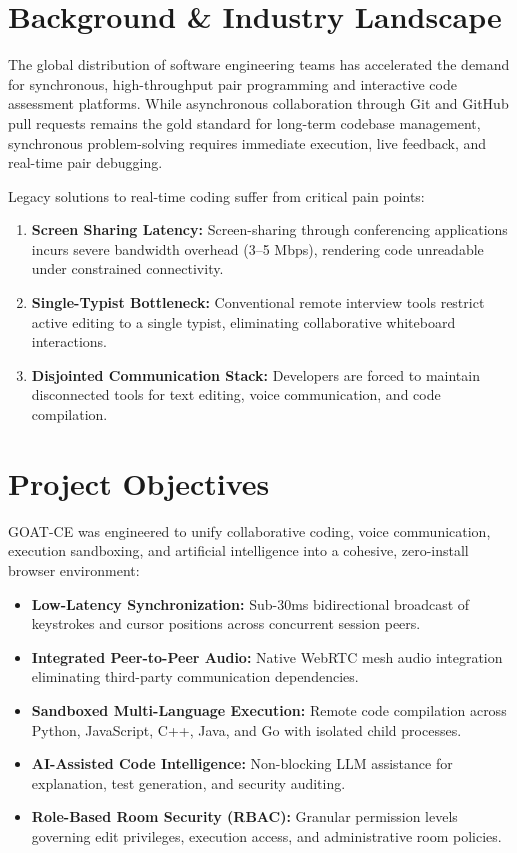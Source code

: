 \documentclass[12pt,a4paper]{report}
\begin{document}
\section{Background \& Industry Landscape}
The global distribution of software engineering teams has accelerated the demand for synchronous, high-throughput pair programming and interactive code assessment platforms. While asynchronous collaboration through Git and GitHub pull requests remains the gold standard for long-term codebase management, synchronous problem-solving requires immediate execution, live feedback, and real-time pair debugging.

Legacy solutions to real-time coding suffer from critical pain points:
\begin{enumerate}
    \item \textbf{Screen Sharing Latency:} Screen-sharing through conferencing applications incurs severe bandwidth overhead (3--5 Mbps), rendering code unreadable under constrained connectivity.
    \item \textbf{Single-Typist Bottleneck:} Conventional remote interview tools restrict active editing to a single typist, eliminating collaborative whiteboard interactions.
    \item \textbf{Disjointed Communication Stack:} Developers are forced to maintain disconnected tools for text editing, voice communication, and code compilation.
\end{enumerate}

\section{Project Objectives}
GOAT-CE was engineered to unify collaborative coding, voice communication, execution sandboxing, and artificial intelligence into a cohesive, zero-install browser environment:
\begin{itemize}
    \item \textbf{Low-Latency Synchronization:} Sub-30ms bidirectional broadcast of keystrokes and cursor positions across concurrent session peers.
    \item \textbf{Integrated Peer-to-Peer Audio:} Native WebRTC mesh audio integration eliminating third-party communication dependencies.
    \item \textbf{Sandboxed Multi-Language Execution:} Remote code compilation across Python, JavaScript, C++, Java, and Go with isolated child processes.
    \item \textbf{AI-Assisted Code Intelligence:} Non-blocking LLM assistance for explanation, test generation, and security auditing.
    \item \textbf{Role-Based Room Security (RBAC):} Granular permission levels governing edit privileges, execution access, and administrative room policies.
\end{itemize}
\end{document}

